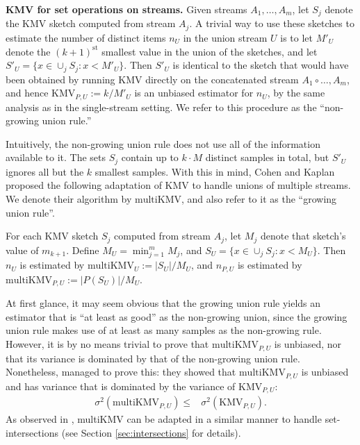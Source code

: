 \documentclass{article}
\newcommand{\edit}[1]{{#1}}
\newcommand{\kedit}[1]{{#1}}
\newcommand{\romKMV}{\mathrm{KMV}}
\newcommand{\romIKMV}{\mathrm{multiKMV}}
\begin{document}
\medskip
\noindent \textbf{KMV for set operations on streams.} 
\edit{Given streams $A_1, \dots, A_m$, let $S_j$ denote the KMV sketch computed from stream $A_j$.
A trivial way to use these sketches to estimate the number of distinct items $n_U$ in the union stream $U$
is to let $M'_U$ denote the $(k+1)^{\text{st}}$ smallest value in the union of the sketches, and let $S'_U = \{x \in \cup_j S_j\colon x < M'_U\}$.
Then $S'_U$ is identical to the sketch that would have been obtained by running KMV directly on the concatenated stream $A_1 \circ \dots, A_m$,
and hence $\romKMV_{P,U} := k/M'_U$ is an unbiased estimator for $n_U$, by the same analysis as in the single-stream setting. 
We refer to this procedure as the ``non-growing union rule.''}

\edit{Intuitively, the non-growing union rule does not use all of the information available to it. The sets $S_j$ contain up to $k \cdot M$
distinct samples in total, but $S'_U$ ignores all but the $k$ smallest samples. 
With this in mind, Cohen and Kaplan \cite{cohen2009leveraging} proposed the following 
adaptation of KMV to handle unions of multiple streams. We denote their algorithm by $\romIKMV$, and also refer to it as the
``growing union rule''.}

For each KMV  sketch $S_j$ computed from stream $A_j$, let $M_j$ denote that sketch's value of $m_{k+1}$. 
Define $M_U = \min_{j=1}^m M_j$, and $S_U = \{x \in \cup_j S_j\colon x < M_U\}$.
Then $n_U$ is estimated by $\romIKMV_U := |S_U|/M_U$, 
and  $n_{P, U}$ is estimated by $\romIKMV_{P, U} := |P(S_U)| /M_U$. 

\edit{At first glance, it may seem obvious that the growing union rule yields an estimator that is 
``at least as good'' as the non-growing union, since the growing union rule makes use of at least as many samples
as the non-growing rule. However, it is by no means trivial to prove that $\romIKMV_{P, U}$ is unbiased,
nor that its variance is dominated by that of the non-growing union rule.}
\kedit{Nonetheless, \cite{cohen2009leveraging} managed to prove this: they showed that $\romIKMV_{P, U}$ is unbiased and has
variance that is dominated by the variance of $\romKMV_{P,U}$:}
\begin{align}
\sigma^2(\romIKMV_{P, U}) \le & \sigma^2(\romKMV_{P,U}). \label{growing-variance-dominates}
\end{align}
As observed in \cite{cohen2009leveraging}, multiKMV can be adapted in a similar manner to handle set-intersections 
\edit{(see Section \ref{sec:intersections} for details).}
\end{document}
